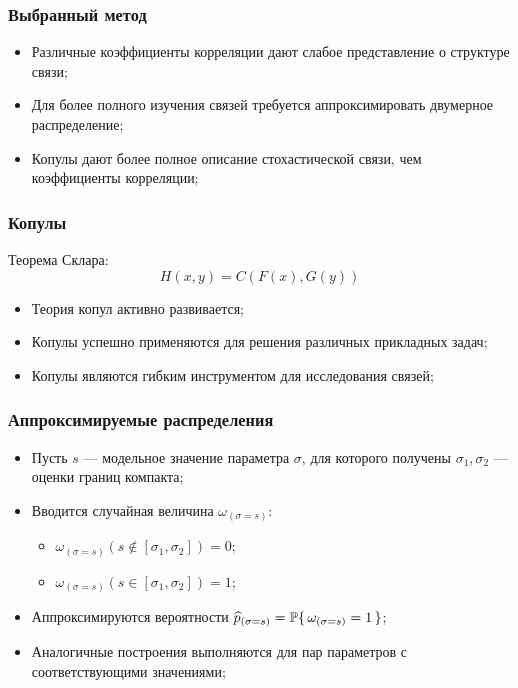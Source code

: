 \documentclass[11pt]{beamer}
\begin{document}
\begin{frame}
\frametitle{Выбранный метод}
\begin{itemize}
  \item Различные коэффициенты корреляции дают слабое представление о структуре связи;
  \item Для более полного изучения связей требуется аппроксимировать двумерное распределение;
  \item Копулы дают более полное описание стохастической связи, чем коэффициенты корреляции;
\end{itemize}
\end{frame}

\begin{frame}
\begin{center}
\frametitle{Копулы}
Теорема Склара:
\begin{equation}
H(x, y) = C(F(x), G(y))
\end{equation}
\begin{itemize}
  \item Теория копул активно развивается;
  \item Копулы успешно применяются для решения различных прикладных задач;
  \item Копулы являются гибким инструментом для исследования связей;
\end{itemize}
\end{center}
\end{frame}

\begin{frame}
\begin{center}
\frametitle{Аппроксимируемые распределения}
\begin{itemize}
  \item Пусть $s$ --- модельное значение параметра $\sigma$, для которого получены $\sigma_1, \sigma_2$ --- оценки границ компакта;
  \item Вводится случайная величина $\omega_{(\sigma = s)}$:
  \begin{itemize}
    \item $\omega_{(\sigma = s)}(s \notin [\sigma_1, \sigma_2]) = 0$;
    \item $\omega_{(\sigma = s)}(s \in [\sigma_1, \sigma_2]) = 1$;
  \end{itemize}
  \item Аппроксимируются вероятности $\widehat{p}_{(\sigma = s)} = \P\{\, \omega_{(\sigma = s)} = 1\,\}$;
  \item Аналогичные построения выполняются для пар параметров с соответствующими значениями;
\end{itemize}
\end{center}
\end{frame}
\end{document}
